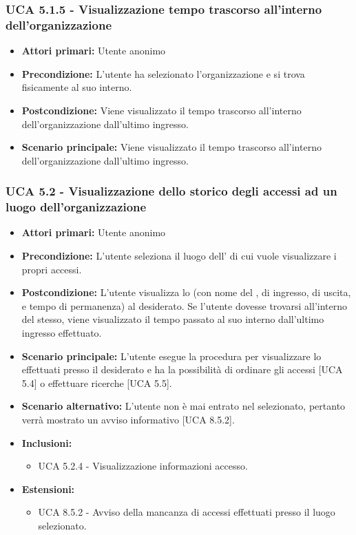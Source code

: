 \subsubsection{UCA 5.1.5 - Visualizzazione tempo trascorso all'interno dell'organizzazione}
\begin{itemize}
	\item \textbf{Attori primari:} Utente anonimo
	\item \textbf{Precondizione:} L'utente ha selezionato l'organizzazione e si trova fisicamente al suo interno.
	\item \textbf{Postcondizione:} Viene visualizzato il tempo trascorso all'interno dell'organizzazione dall'ultimo ingresso.
	\item \textbf{Scenario principale:} Viene visualizzato il tempo trascorso all'interno dell'organizzazione dall'ultimo ingresso.
\end{itemize}

\subsubsection{UCA 5.2 - Visualizzazione dello storico degli accessi ad un luogo dell'organizzazione}
\begin{itemize}
    \item \textbf{Attori primari:} Utente anonimo
    \item \textbf{Precondizione:} L'utente seleziona il luogo dell' di cui vuole visualizzare i propri accessi.
    \item \textbf{Postcondizione:} L'utente visualizza lo  (con nome del ,  di ingresso, di uscita, e tempo di permanenza) al  desiderato. Se l'utente dovesse trovarsi all'interno del  stesso, viene visualizzato il tempo passato al suo interno dall'ultimo ingresso effettuato.
    \item \textbf{Scenario principale:} L'utente esegue la procedura per visualizzare lo  effettuati presso il  desiderato e ha la possibilità di ordinare gli accessi [UCA 5.4] o effettuare ricerche [UCA 5.5].
    \item \textbf{Scenario alternativo:} L'utente non è mai entrato nel  selezionato, pertanto verrà mostrato un avviso informativo [UCA 8.5.2].
    \item \textbf{Inclusioni:}
    \begin{itemize}
        \item UCA 5.2.4 - Visualizzazione informazioni accesso.
    \end{itemize}
    \item \textbf{Estensioni:}
    \begin{itemize}
        \item UCA 8.5.2 - Avviso della mancanza di accessi effettuati presso il luogo selezionato.
    \end{itemize}
\end{itemize}

